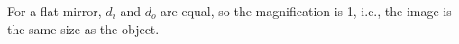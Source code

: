 For a flat mirror, $d_i$ and $d_o$ are equal, so the
magnification is 1, i.e., the image is the same size as the object.
